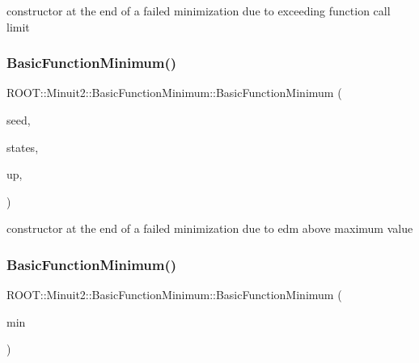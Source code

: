 constructor at the end of a failed minimization due to exceeding function call limit 

\mbox{\label{classROOT_1_1Minuit2_1_1BasicFunctionMinimum_ae30a460175a2bbf715f3ee0d6092c8b6}} 
\subsubsection{\texorpdfstring{BasicFunctionMinimum()}{BasicFunctionMinimum()}\hspace{0.1cm}{\footnotesize\ttfamily [14/15]}}
{\footnotesize\ttfamily R\+O\+O\+T\+::\+Minuit2\+::\+Basic\+Function\+Minimum\+::\+Basic\+Function\+Minimum (\begin{DoxyParamCaption}\item[{const \mbox{\hyperlink{classROOT_1_1Minuit2_1_1MinimumSeed}{Minimum\+Seed}} \&}]{seed,  }\item[{const std\+::vector$<$ \mbox{\hyperlink{classROOT_1_1Minuit2_1_1MinimumState}{Minimum\+State}} $>$ \&}]{states,  }\item[{double}]{up,  }\item[{\mbox{\hyperlink{classROOT_1_1Minuit2_1_1BasicFunctionMinimum_1_1MnAboveMaxEdm}{Mn\+Above\+Max\+Edm}}}]{ }\end{DoxyParamCaption})\hspace{0.3cm}{\ttfamily [inline]}}



constructor at the end of a failed minimization due to edm above maximum value 

\mbox{\label{classROOT_1_1Minuit2_1_1BasicFunctionMinimum_ae0812dcb933989ffd9e096792367d0b7}} 
\subsubsection{\texorpdfstring{BasicFunctionMinimum()}{BasicFunctionMinimum()}\hspace{0.1cm}{\footnotesize\ttfamily [15/15]}}
{\footnotesize\ttfamily R\+O\+O\+T\+::\+Minuit2\+::\+Basic\+Function\+Minimum\+::\+Basic\+Function\+Minimum (\begin{DoxyParamCaption}\item[{const \mbox{\hyperlink{classROOT_1_1Minuit2_1_1BasicFunctionMinimum}{Basic\+Function\+Minimum}} \&}]{min }\end{DoxyParamCaption})\hspace{0.3cm}{\ttfamily [inline]}}



